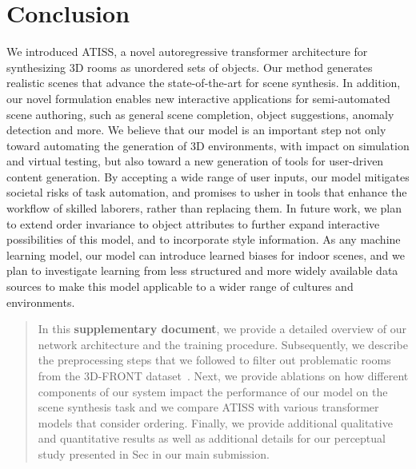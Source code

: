 \documentclass{article}
\begin{document}
\vspace{-2mm}
\section{Conclusion}\label{sec:conclusion}
\vspace{-2mm}



We introduced ATISS,
 a novel autoregressive transformer architecture for
synthesizing 3D rooms as unordered sets of objects. Our method generates realistic scenes that advance the state-of-the-art for scene synthesis. In addition, our novel formulation enables new interactive applications for semi-automated scene authoring, such as general scene completion, object suggestions, anomaly detection and more. We believe that our model is an important step not only toward automating the generation of 3D environments, with impact on simulation and virtual testing, but also toward a new generation of tools for user-driven content generation. By accepting a wide range of user inputs, our model mitigates societal risks of task automation, and promises to usher in tools that enhance the workflow of skilled laborers, rather than replacing them. In future work, we plan to extend order invariance to object attributes to further expand interactive possibilities of this model, and to incorporate style information. As any machine learning model, our model can introduce learned biases for indoor scenes, and we plan to investigate learning from less structured and more widely available data sources to make this model applicable to a wider range of cultures and environments.


{\small
	
	
}

\newpage
\clearpage
\appendix


\begin{abstract}
In this \textbf{supplementary document}, we provide a detailed overview of our
network architecture and the training procedure. Subsequently, we describe
the preprocessing steps that we followed to filter out problematic rooms from
the 3D-FRONT dataset~\cite{Fu2020ARXIVa}. Next, we provide ablations on how
different components of our system impact the performance of our model on the
scene synthesis task and we compare ATISS with various transformer models that
consider ordering. Finally, we provide additional qualitative and quantitative
results as well as additional details for our perceptual study presented in Sec
 in our main submission.
\end{abstract}
\end{document}
